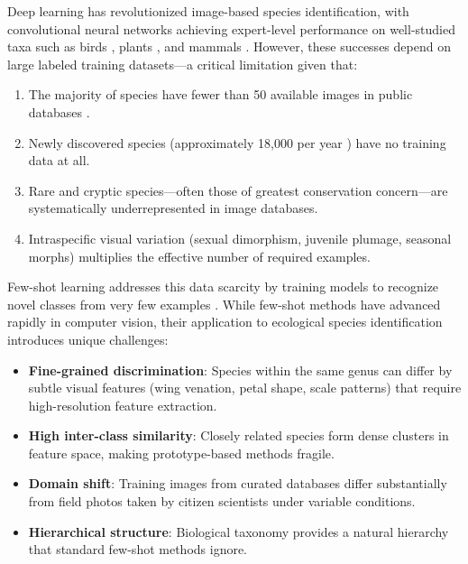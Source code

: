 \documentclass[11pt,a4paper]{article}
\begin{document}
Deep learning has revolutionized image-based species identification, with
convolutional neural networks achieving expert-level performance on
well-studied taxa such as birds \citep{van2015building}, plants
\citep{goeau2022overview}, and mammals \citep{norouzzadeh2018automatically}.
However, these successes depend on large labeled training datasets---a
critical limitation given that:

\begin{enumerate}[label=(\roman*)]
  \item The majority of species have fewer than 50 available images in
    public databases \citep{lorieul2022overview}.
  \item Newly discovered species (approximately 18{,}000 per year
    \citep{costello2013can}) have no training data at all.
  \item Rare and cryptic species---often those of greatest conservation
    concern---are systematically underrepresented in image databases.
  \item Intraspecific visual variation (sexual dimorphism, juvenile
    plumage, seasonal morphs) multiplies the effective number of
    required examples.
\end{enumerate}

Few-shot learning addresses this data scarcity by training models to
recognize novel classes from very few examples
\citep{wang2020generalizing}. While few-shot methods have advanced
rapidly in computer vision, their application to ecological species
identification introduces unique challenges:

\begin{itemize}
  \item \textbf{Fine-grained discrimination}: Species within the same
    genus can differ by subtle visual features (wing venation, petal
    shape, scale patterns) that require high-resolution feature
    extraction.
  \item \textbf{High inter-class similarity}: Closely related species
    form dense clusters in feature space, making prototype-based
    methods fragile.
  \item \textbf{Domain shift}: Training images from curated databases
    differ substantially from field photos taken by citizen scientists
    under variable conditions.
  \item \textbf{Hierarchical structure}: Biological taxonomy provides a
    natural hierarchy that standard few-shot methods ignore.
\end{itemize}
\end{document}
